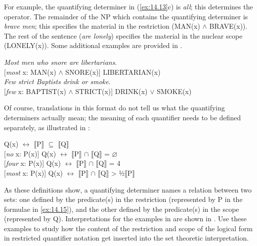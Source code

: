 For example, the quantifying determiner in (\ref{ex:14.13}c) is \textit{all}; this determines the operator. The remainder of the NP which contains the quantifying determiner is \textit{brave men}; this specifies the material in the restriction (MAN(x) $\wedge$ BRAVE(x)). The rest of the sentence (\textit{are lonely}) specifies the material in the nuclear scope (LONELY(x)). Some additional examples are provided in .


\ea \label{ex:14.14}
\ea  \textit{Most men who snore are libertarians}.\\
  {}[\textit{most} x: MAN(x) $\wedge$ SNORE(x)] LIBERTARIAN(x)\\
\ex \textit{Few strict Baptists drink or smoke}.\\
  {}[\textit{few} x: BAPTIST(x) $\wedge$ STRICT(x)] DRINK(x) $\vee$ SMOKE(x)
                       \z
\z


Of course, translations in this format do not tell us what the quantifying determiners actually mean; the meaning of each quantifier needs to be defined separately, as illustrated in :


\ea \label{ex:14.15}
\ea {} Q(x)  $\leftrightarrow $  \textsc{$\llbracket$}P$\rrbracket$  ${\subseteq}$ \textsc{$\llbracket$}Q$\rrbracket$ \\
\ex{} [\textit{no} x: P(x)] Q(x)  $\leftrightarrow $  \textsc{$\llbracket$}P$\rrbracket$  ${\cap}$ \textsc{$\llbracket$}Q$\rrbracket$  = ⌀\\
\ex{} [\textit{four} x: P(x)] Q(x)  $\leftrightarrow $  {\textbar} \textsc{$\llbracket$}P$\rrbracket$  ${\cap}$ \textsc{$\llbracket$}Q$\rrbracket$  {\textbar}  = 4\\
\ex{} [\textit{most} x: P(x)] Q(x)  $\leftrightarrow $  {\textbar} \textsc{$\llbracket$}P$\rrbracket$  ${\cap}$ \textsc{$\llbracket$}Q$\rrbracket$  {\textbar}  >  ½\textsc{{\textbar}}\textsc{$\llbracket$}P$\rrbracket$ {\textbar}
                       \z
\z


As these definitions show, a quantifying determiner names a relation between two sets: one defined by the predicate(s) in the restriction (represented by P in the formulae in \ref{ex:14.15}), and the other defined by the predicate(s) in the scope (represented by Q). Interpretations for the examples in  are shown in . Use these examples to study how the content of the restriction and scope of the logical form in restricted quantifier notation get inserted into the set theoretic interpretation.


